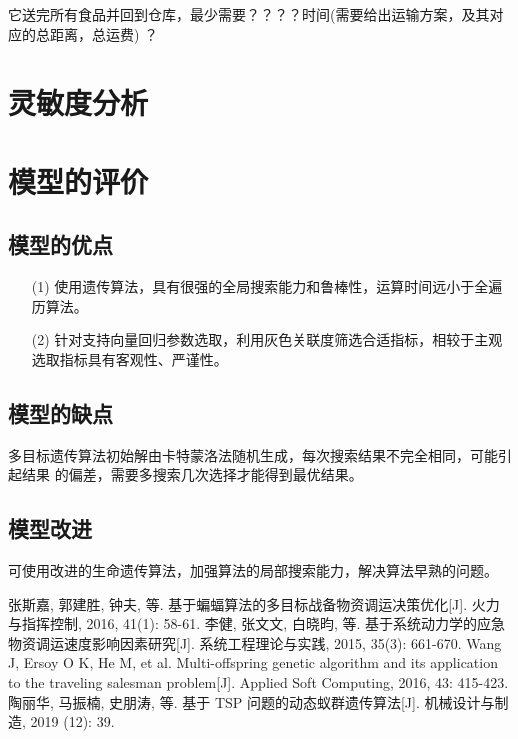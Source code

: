 \documentclass{whutmod}
\begin{document}
  它送完所有食品并回到仓库，最少需要？？？？时间(需要给出运输方案，及其对应的总距离，总运费) ？
  
  \section{灵敏度分析}
  
  
  
  \section{模型的评价}
  \subsection{模型的优点}
  \begin{itemize}                                             
  	\item [(1)] 使用遗传算法，具有很强的全局搜索能力和鲁棒性，运算时间远小于全遍历算法。
  	
  	\item [(2)] 针对支持向量回归参数选取，利用灰色关联度筛选合适指标，相较于主观选取指标具有客观性、严谨性。	
  \end{itemize}
  \subsection{模型的缺点}
  
多目标遗传算法初始解由卡特蒙洛法随机生成，每次搜索结果不完全相同，可能引起结果 的偏差，需要多搜索几次选择才能得到最优结果。

  \subsection{模型改进}
  
可使用改进的生命遗传算法，加强算法的局部搜索能力，解决算法早熟的问题。

  
  
  
 
	\newpage	%
	\nocite{*}		%
%
%	
\begin{thebibliography}{9}%
	张斯嘉, 郭建胜, 钟夫, 等. 基于蝙蝠算法的多目标战备物资调运决策优化[J]. 火力与指挥控制, 2016, 41(1): 58-61.
	李健, 张文文, 白晓昀, 等. 基于系统动力学的应急物资调运速度影响因素研究[J]. 系统工程理论与实践, 2015, 35(3): 661-670.	
	Wang J, Ersoy O K, He M, et al. Multi-offspring genetic algorithm and its application to the traveling salesman problem[J]. Applied Soft Computing, 2016, 43: 415-423.
	陶丽华, 马振楠, 史朋涛, 等. 基于 TSP 问题的动态蚁群遗传算法[J]. 机械设计与制造, 2019 (12): 39.
\end{thebibliography}
\end{document}

